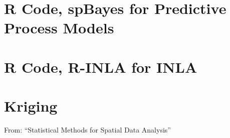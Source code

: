 \documentclass{article}
\begin{document}
\section{R Code, spBayes for Predictive Process Models} %

\section{R Code, R-INLA for INLA}

\section{Kriging}

From: ``Statistical Methods for Spatial Data Analysis'' \citep{Schabenberger2004}
\end{document}
